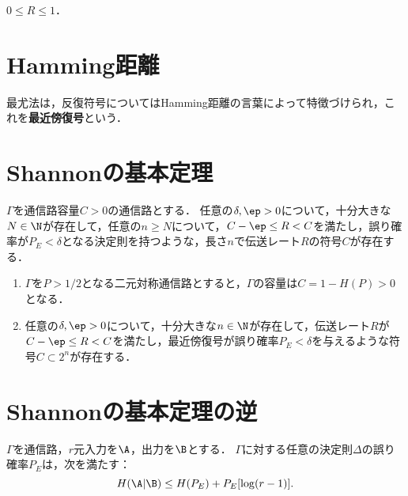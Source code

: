 \documentclass[uplatex,dvipdfmx]{jsreport}
\begin{document}
\begin{lemma}
    $0\le R\le 1$．
\end{lemma}

\section{Hamming距離}

\begin{tcolorbox}[colframe=ForestGreen, colback=ForestGreen!10!white,breakable,colbacktitle=ForestGreen!40!white,coltitle=black,fonttitle=\bfseries\sffamily,
title=]
    最尤法は，反復符号についてはHamming距離の言葉によって特徴づけられ，これを\textbf{最近傍復号}という．
\end{tcolorbox}

\section{Shannonの基本定理}

\begin{theorem}
    $\Gamma$を通信路容量$C>0$の通信路とする．
    任意の$\delta,\ep>0$について，十分大きな$N\in\N$が存在して，任意の$n\ge N$について，$C-\ep\le R<C$を満たし，誤り確率が$P_E<\delta$となる決定則を持つような，長さ$n$で伝送レート$R$の符号$C$が存在する．
\end{theorem}


\begin{corollary}\mbox{}
    \begin{enumerate}
        \item $\Gamma$を$P>1/2$となる二元対称通信路とすると，$\Gamma$の容量は$C=1-H(P)>0$となる．
        \item 任意の$\delta,\ep>0$について，十分大きな$n\in\N$が存在して，伝送レート$R$が$C-\ep\le R<C$を満たし，最近傍復号が誤り確率$P_E<\delta$を与えるような符号$C\subset2^n$が存在する．
    \end{enumerate}
\end{corollary}

\section{Shannonの基本定理の逆}

\begin{theorem}
    $\Gamma$を通信路，$r$元入力を$\A$，出力を$\B$とする．
    $\Gamma$に対する任意の決定則$\Delta$の誤り確率$P_E$は，次を満たす：
    \[H(\A|\B)\le H(P_E)+P_E[\log(r-1)].\]
\end{theorem}
\end{document}
